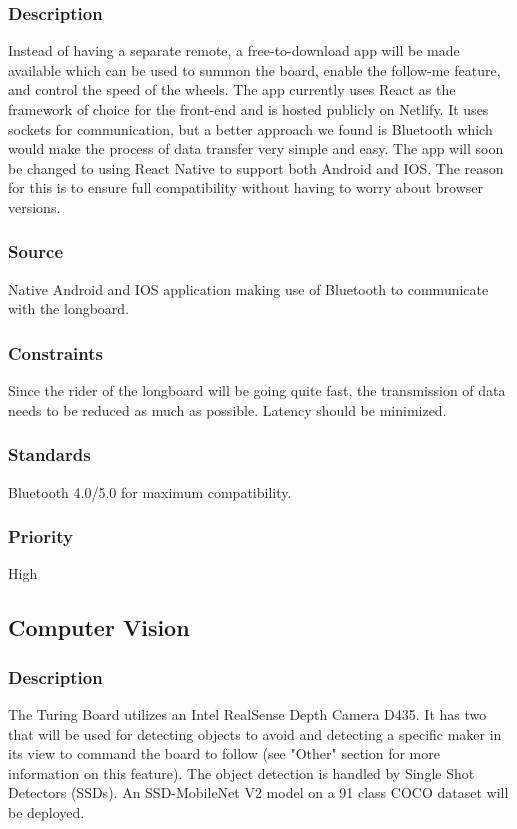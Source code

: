 \subsubsection{Description}
Instead of having a separate remote, a free-to-download app will be made available which can be used to summon the board, enable the follow-me feature, and control the speed of the wheels. The app currently uses React as the framework of choice for the front-end and is hosted publicly on Netlify. It uses sockets for communication, but a better approach we found is Bluetooth which would make the process of data transfer very simple and easy. The app  will soon be changed to using React Native to support both Android and IOS. The reason for this is to ensure full compatibility without having to worry about browser versions.
\subsubsection{Source}
Native Android and IOS application making use of Bluetooth to communicate with the longboard.
\subsubsection{Constraints}
Since the rider of the longboard will be going quite fast, the transmission of data needs to be reduced as much as possible. Latency should be minimized.
\subsubsection{Standards}
Bluetooth 4.0/5.0 for maximum compatibility.
\subsubsection{Priority}
High

\subsection{Computer Vision}
\subsubsection{Description}
The Turing Board utilizes an Intel RealSense Depth Camera D435. It has two that will be used for detecting objects to avoid and detecting a specific maker in its view to command the board to follow (see "Other" section for more information on this feature). The object detection is handled by Single Shot Detectors (SSDs). An SSD-MobileNet V2 model on a 91 class COCO dataset will be deployed.

